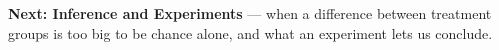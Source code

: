 \documentclass[12pt]{article}
\begin{document}
\vspace{0.04in}

\boxguard[3]
\begin{spiralbox}
\small
\textbf{Next: Inference and Experiments} --- when a difference between treatment groups is too
big to be chance alone, and what an experiment lets us conclude.
\end{spiralbox}
\end{document}
